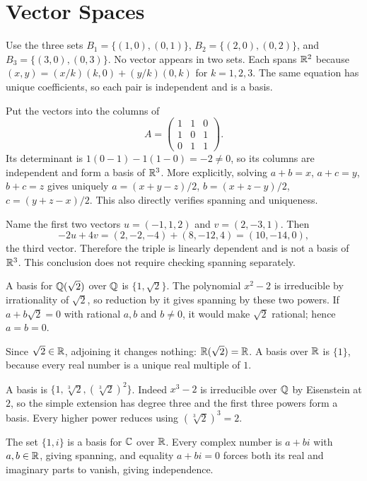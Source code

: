 \section{Vector Spaces}

Use the three sets $B_1=\{(1,0),(0,1)\}$, $B_2=\{(2,0),(0,2)\}$, and $B_3=\{(3,0),(0,3)\}$. No vector appears in two sets. Each spans $\mathbb{R}^2$ because $(x,y)=(x/k)(k,0)+(y/k)(0,k)$ for $k=1,2,3$. The same equation has unique coefficients, so each pair is independent and is a basis.

Put the vectors into the columns of
\[A=\begin{pmatrix}1&1&0\\1&0&1\\0&1&1\end{pmatrix}.\]
Its determinant is $1(0-1)-1(1-0)=-2\ne0$, so its columns are independent and form a basis of $\mathbb{R}^3$. More explicitly, solving $a+b=x$, $a+c=y$, $b+c=z$ gives uniquely $a=(x+y-z)/2$, $b=(x+z-y)/2$, $c=(y+z-x)/2$. This also directly verifies spanning and uniqueness.

Name the first two vectors $u=(-1,1,2)$ and $v=(2,-3,1)$. Then
\[-2u+4v=(2,-2,-4)+(8,-12,4)=(10,-14,0),\]
the third vector. Therefore the triple is linearly dependent and is not a basis of $\mathbb{R}^3$. This conclusion does not require checking spanning separately.

A basis for $\mathbb{Q}(\sqrt2)$ over $\mathbb{Q}$ is $\{1,\sqrt2\}$. The polynomial $x^2-2$ is irreducible by irrationality of $\sqrt2$, so reduction by it gives spanning by these two powers. If $a+b\sqrt2=0$ with rational $a,b$ and $b\ne0$, it would make $\sqrt2$ rational; hence $a=b=0$.

Since $\sqrt2\in\mathbb{R}$, adjoining it changes nothing: $\mathbb{R}(\sqrt2)=\mathbb{R}$. A basis over $\mathbb{R}$ is $\{1\}$, because every real number is a unique real multiple of $1$.

A basis is $\{1,\sqrt[3]2,(\sqrt[3]2)^2\}$. Indeed $x^3-2$ is irreducible over $\mathbb{Q}$ by Eisenstein at $2$, so the simple extension has degree three and the first three powers form a basis. Every higher power reduces using $(\sqrt[3]2)^3=2$.

The set $\{1,i\}$ is a basis for $\mathbb{C}$ over $\mathbb{R}$. Every complex number is $a+bi$ with $a,b\in\mathbb{R}$, giving spanning, and equality $a+bi=0$ forces both its real and imaginary parts to vanish, giving independence.

